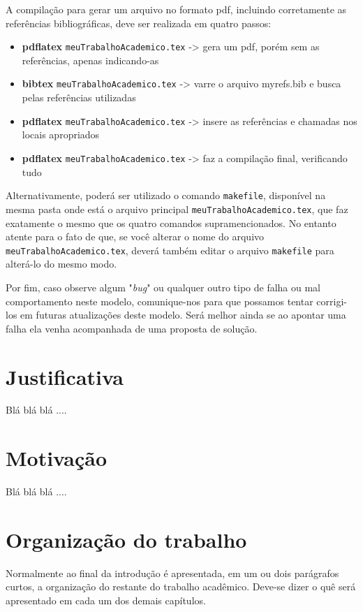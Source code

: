 A compilação para gerar um arquivo no formato pdf, incluindo corretamente as
referências bibliográficas, deve ser realizada em quatro passos:

\begin{itemize}
    \item \textbf{pdflatex} \verb|meuTrabalhoAcademico.tex| -> gera um pdf, porém sem as referências, apenas indicando-as
    \item \textbf{bibtex} \verb|meuTrabalhoAcademico.tex|   -> varre o arquivo myrefs.bib e busca pelas referências utilizadas
    \item \textbf{pdflatex} \verb|meuTrabalhoAcademico.tex| -> insere as referências e chamadas nos locais apropriados
    \item \textbf{pdflatex} \verb|meuTrabalhoAcademico.tex| -> faz a compilação final, verificando tudo
\end{itemize}

Alternativamente, poderá ser utilizado o comando \verb|makefile|, disponível na
mesma pasta onde está o arquivo principal \verb|meuTrabalhoAcademico.tex|, que
faz exatamente o mesmo que os quatro comandos supramencionados. No entanto
atente para o fato de que, se você alterar o nome do arquivo
\verb|meuTrabalhoAcademico.tex|, deverá também editar o arquivo \verb|makefile|
para alterá-lo do mesmo modo.

Por fim, caso observe algum "\textit{bug}"{} ou qualquer outro tipo de falha ou
mal comportamento neste modelo, comunique-nos para que possamos tentar
corrigi-los em futuras atualizações deste modelo. Será melhor ainda se ao
apontar uma falha ela venha acompanhada de uma proposta de solução.

\section{Justificativa}
\label{sec:Justification}

Blá blá blá ....

\section{Motivação}
\label{sec:Motivation}

Blá blá blá ....

\section{Organização do trabalho}
\label{sec:ThesisOrganization}

Normalmente ao final da introdução é apresentada, em um ou dois parágrafos
curtos, a organização do restante do trabalho acadêmico. Deve-se dizer o quê
será apresentado em cada um dos demais capítulos.
